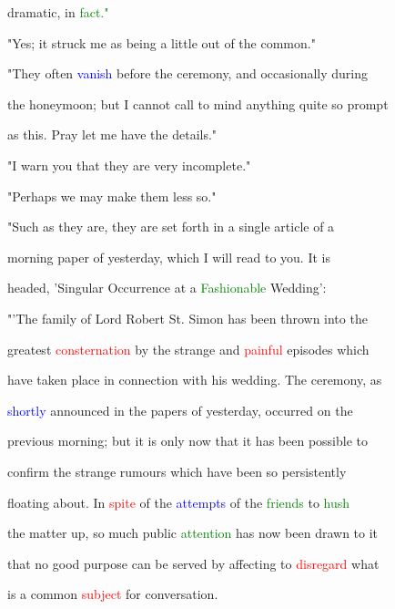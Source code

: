  dramatic, in \textcolor{green}{fact."}



 "Yes; it struck me as being a little out of the common."



 "They often \textcolor{blue}{vanish} before the \textcolor{BurntOrange}{ceremony,} and occasionally during

 the \textcolor{BurntOrange}{honeymoon;} but I cannot call to mind anything quite so prompt

 as this. \textcolor{BurntOrange}{Pray} let me have the details."



 "I \textcolor{BurntOrange}{warn} you that they are very incomplete."



 "Perhaps we may make them less so."



 "Such as they are, they are set forth in a single article of a

 morning paper of yesterday, which I will read to you. It is

 headed, 'Singular Occurrence at a \textcolor{green}{Fashionable} Wedding':



 "'The family of \textcolor{BurntOrange}{Lord} Robert St. Simon has been thrown into the

 greatest \textcolor{red}{consternation} by the strange and \textcolor{red}{painful} episodes which

 have taken place in connection with his wedding. The \textcolor{BurntOrange}{ceremony,} as

 \textcolor{blue}{shortly} announced in the papers of yesterday, occurred on the

 previous morning; but it is only now that it has been possible to

 confirm the strange rumours which have been so persistently

 floating about. In \textcolor{red}{spite} of the \textcolor{blue}{attempts} of the \textcolor{green}{friends} to \textcolor{green}{hush}

 the matter up, so much \textcolor{BurntOrange}{public} \textcolor{green}{attention} has now been drawn to it

 that no \textcolor{BurntOrange}{good} purpose can be \textcolor{BurntOrange}{served} by affecting to \textcolor{red}{disregard} what

 is a common \textcolor{red}{subject} for conversation.



